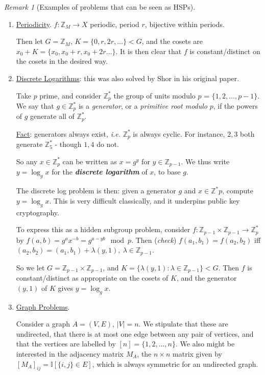 \documentclass[]{article}
\theoremstyle{custhm}
\theoremstyle{cusdef}
\theoremstyle{custhm}
\theoremstyle{custhm}
\theoremstyle{custhm}
\theoremstyle{custhm}
\theoremstyle{cusdef}
\theoremstyle{remark}
\newtheorem*{remark*}{Remark}
\newcommand{\Z}{\mathbb{Z}}
\newcommand{\ra}{\rightarrow}
\newcommand{\undf}[1]{\textit{\textbf{#1}}}
\renewcommand{\it}[1]{\textit{#1}}
\begin{document}
\begin{remark*}[Examples of problems that can be seen as HSPs]\ 
\begin{enumerate}[label = (\alph*)]
	\item \underline{Periodicity}. $f:\Z_M \ra X$ periodic, period $r$, bijective within periods.
	
	Then let $G = \Z_M$, $K = \{0,r,2r,\dots\} < G$, and the cosets are $x_0 + K = \{x_0,x_0+r,x_0+2r\dots\}$. It is then clear that $f$ is constant/distinct on the cosets in the desired way.
	
	\item \underline{Discrete Logarithms}: this was also solved by Shor in his original paper.
	
	Take $p$ prime, and consider $\Z_p^\ast$ the group of units modulo $p$ = $\{1,2,\dots,p-1\}$. We say that $g\in \Z_p^\ast$ is a \it{generator}, or a \it{primitive root modulo} $p$, if the powers of $g$ generate all of $\Z_p^\ast$.
	
	\underline{Fact}: generators always exist, \it{i.e.} $\Z_p^\ast$ is always cyclic. For instance, $2,3$ both generate $\Z_5^\ast$ - though $1,4$ do not.
	
	So any $x\in \Z^\ast_p$ can be written as $x = g^y$ for $y \in \Z_{p-1}$. We thus write $y = \log_g x$ for the \undf{discrete logarithm} of $x$, to base $g$.
	
	The discrete log problem is then: given a generator $g$ and $x\in \Z^\ast p$, compute $y = \log_g x$. This is very difficult classically, and it underpins public key cryptography.
	
	To express this as a hidden subgroup problem, consider $f:\Z_{p-1}\times\Z_{p-1}\ra\Z_p^\ast$ by $f(a,b) = g^ax^{-b} = g^{a-yb} \mod p$. Then (\it{check}) $f(a_1,b_1) = f(a_2,b_2)$ iff $(a_2,b_2) = (a_1,b_1)+\lambda (y,1),\ \lambda \in \Z_{p-1}$.
	
	So we let $G = \Z_{p-1}\times\Z_{p-1}$, and $K = \{\lambda(y,1):\lambda \in \Z_{p-1}\} < G$. Then $f$ is constant/distinct as appropriate on the cosets of $K$, and the generator $(y,1)$ of $K$ gives $y = \log_g x$.
	
	\item \underline{Graph Problems}.
	
	Consider a graph $A = (V,E)$, $|V| = n$. We stipulate that these are undirected, that there is at most one edge between any pair of vertices, and that the vertices are labelled by $[n] = \{1,2,\dots,n\}$. We also might be interested in the adjacency matrix $M_A$, the $n\times n$ matrix given by $[M_A]_{ij} = \mathbb{I}[\{i,j\}\in E]$, which is always symmetric for an undirected graph.
	

\end{enumerate}
\end{remark*}
\end{document}
